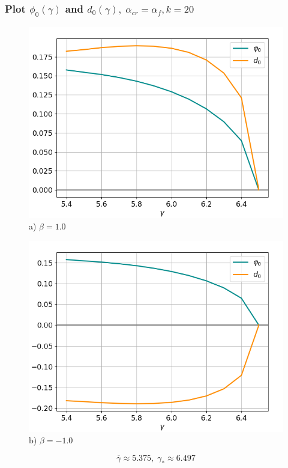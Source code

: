 \documentclass[fullscreen=true, unicode, bookmarks=false]{beamer}
\begin{document}
\begin{frame}
\frametitle{ Plot $ \phi_0(\gamma) $ and $ d_0(\gamma), \; \alpha_{cr} = \alpha_f, k = 20 $ }

\begin{figure} 
\begin{minipage}[h]{0.49\linewidth}
\begin{center}
\includegraphics[scale=0.37]{oscillating_phi0d0_after_tangent_x0_039_beta_10.png} \\ {\scriptsize a) $ \beta = 1.0 $}
\end{center}
\end{minipage} 
\hfill
\begin{minipage}[h]{0.49\linewidth}
\begin{center}
\includegraphics[scale=0.37]{oscillating_phi0d0_after_tangent_x0_039_beta_-10.png}  \\ {\scriptsize b) $ \beta = -1.0 $}
\end{center}
\end{minipage} 
\end{figure}
$$ \overline{\gamma} \approx 5.375, \; \gamma_* \approx 6.497 $$

\end{frame}
\end{document}
